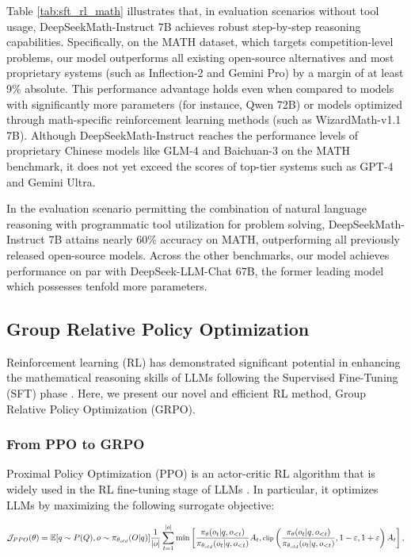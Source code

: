 \begin{itemize}[topsep=0pt]
\begin{itemize}[topsep=0pt]
Table \ref{tab:sft_rl_math} illustrates that, in evaluation scenarios without tool usage, DeepSeekMath-Instruct 7B achieves robust step-by-step reasoning capabilities. Specifically, on the MATH dataset, which targets competition-level problems, our model outperforms all existing open-source alternatives and most proprietary systems (such as Inflection-2 and Gemini Pro) by a margin of at least 9\% absolute. This performance advantage holds even when compared to models with significantly more parameters (for instance, Qwen 72B) or models optimized through math-specific reinforcement learning methods (such as WizardMath-v1.1 7B). Although DeepSeekMath-Instruct reaches the performance levels of proprietary Chinese models like GLM-4 and Baichuan-3 on the MATH benchmark, it does not yet exceed the scores of top-tier systems such as GPT-4 and Gemini Ultra.

In the evaluation scenario permitting the combination of natural language reasoning with programmatic tool utilization for problem solving, DeepSeekMath-Instruct 7B attains nearly 60\% accuracy on MATH, outperforming all previously released open-source models. Across the other benchmarks, our model achieves performance on par with DeepSeek-LLM-Chat 67B, the former leading model which possesses tenfold more parameters.

\subsection{Group Relative Policy Optimization} Reinforcement learning (RL) has demonstrated significant potential in enhancing the mathematical reasoning skills of LLMs following the Supervised Fine-Tuning (SFT) phase \citep{wang2023math,wizardmath}. Here, we present our novel and efficient RL method, Group Relative Policy Optimization (GRPO).

\subsubsection{From PPO to GRPO} Proximal Policy Optimization (PPO) \citep{schulman2017proximal} is an actor-critic RL algorithm that is widely used in the RL fine-tuning stage of LLMs \citep{ouyang2022training}. In particular, it optimizes LLMs by maximizing the following surrogate objective:

\begin{equation}
\footnotesize
    \mathcal{J}_{PPO}(\theta) = \mathbb{E}{[q \sim P(Q), o \sim \pi_{\theta_{old}}(O|q)]} \frac{1}{|o|} \sum_{t=1}^{|o|} \min \left[ \frac{\pi_\theta(o_{t} | q, o_{<t})}{\pi_{\theta_{old}}(o_{t} | q, o_{<t})} A_{t}, \text{clip} \left( \frac{\pi_\theta(o_{t} | q, o_{<t})}{\pi_{\theta_{old}}(o_{t} | q, o_{<t})}, 1 - \varepsilon, 1 + \varepsilon \right)  A_{t} \right] ,
\end{equation}


\end{itemize}
\end{itemize}
